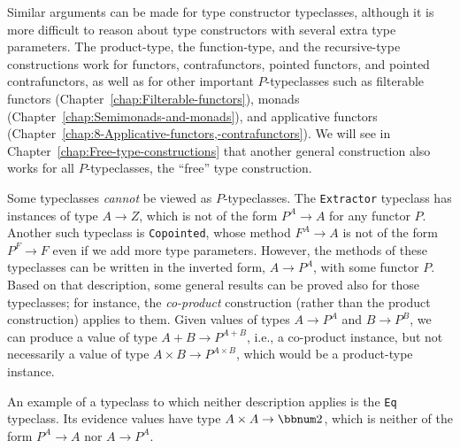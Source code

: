 Similar arguments can be made for type constructor typeclasses, although
it is more difficult to reason about type constructors with several
extra type parameters. The product-type, the function-type, and the
recursive-type constructions work for functors, contrafunctors, pointed
functors, and pointed contrafunctors, as well as for other important
$P$-typeclasses such as filterable functors (Chapter~\ref{chap:Filterable-functors}),
monads (Chapter~\ref{chap:Semimonads-and-monads}), and applicative
functors (Chapter~\ref{chap:8-Applicative-functors,-contrafunctors}).
We will see in Chapter~\ref{chap:Free-type-constructions} that another
general construction also works for all $P$-typeclasses, \textemdash{}
the \textsf{``}free\textsf{''} type construction.

Some typeclasses \emph{cannot} be viewed as $P$-typeclasses. The
\lstinline!Extractor! typeclass has instances of type $A\rightarrow Z$,
which is not of the form $P^{A}\rightarrow A$ for any functor $P$.
Another such typeclass is \lstinline!Copointed!, whose method $F^{A}\rightarrow A$
is not of the form $P^{F}\rightarrow F$ even if we add more type
parameters. However, the methods of these typeclasses can be written
in the inverted form, $A\rightarrow P^{A}$, with some functor $P$.
Based on that description, some general results can be proved also
for those typeclasses; for instance, the \emph{co-product} construction
(rather than the product construction) applies to them. Given values
of types $A\rightarrow P^{A}$ and $B\rightarrow P^{B}$, we can produce
a value of type $A+B\rightarrow P^{A+B}$, i.e., a co-product instance,
but not necessarily a value of type $A\times B\rightarrow P^{A\times B}$,
which would be a product-type instance. 

An example of a typeclass to which neither description applies is
the \lstinline!Eq! typeclass. Its evidence values have type $A\times A\rightarrow\bbnum 2$,
which is neither of the form $P^{A}\rightarrow A$ nor $A\rightarrow P^{A}$.


